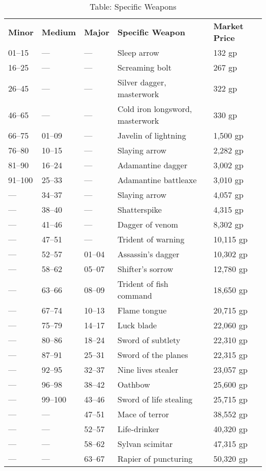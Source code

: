 \begin{table}[]
\sffamily
\caption{Table: Specific Weapons}
\begin{tabular}{lllll}
\textbf{Minor} & \textbf{Medium} & \textbf{Major} & \textbf{Specific Weapon} & \textbf{Market Price}\\
01–15 & — & — & Sleep arrow & 132 gp\\
16–25 & — & — & Screaming bolt & 267 gp\\
26–45 & — & — & Silver dagger, masterwork & 322 gp\\
46–65 & — & — & Cold iron longsword, masterwork & 330 gp\\
66–75 & 01–09 & — & Javelin of lightning & 1,500 gp\\
76–80 & 10–15 & — & Slaying arrow & 2,282 gp\\
81–90 & 16–24 & — & Adamantine dagger & 3,002 gp\\
91–100 & 25–33 & — & Adamantine battleaxe & 3,010 gp\\
— & 34–37 & — & Slaying arrow & 4,057 gp\\
— & 38–40 & — & Shatterspike & 4,315 gp\\
— & 41–46 & — & Dagger of venom & 8,302 gp\\
— & 47–51 & — & Trident of warning & 10,115 gp\\
— & 52–57 & 01–04 & Assassin's dagger & 10,302 gp\\
— & 58–62 & 05–07 & Shifter's sorrow & 12,780 gp\\
— & 63–66 & 08–09 & Trident of fish command & 18,650 gp\\
— & 67–74 & 10–13 & Flame tongue & 20,715 gp\\
— & 75–79 & 14–17 & Luck blade & 22,060 gp\\
— & 80–86 & 18–24 & Sword of subtlety & 22,310 gp\\
— & 87–91 & 25–31 & Sword of the planes & 22,315 gp\\
— & 92–95 & 32–37 & Nine lives stealer & 23,057 gp\\
— & 96–98 & 38–42 & Oathbow & 25,600 gp\\
— & 99–100 & 43–46 & Sword of life stealing & 25,715 gp\\
— & — & 47–51 & Mace of terror & 38,552 gp\\
— & — & 52–57 & Life-drinker & 40,320 gp\\
— & — & 58–62 & Sylvan scimitar & 47,315 gp\\
— & — & 63–67 & Rapier of puncturing & 50,320 gp\\

\end{tabular}
\end{table}
